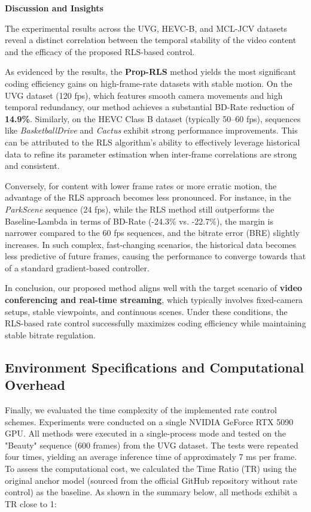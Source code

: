 \noindent \textbf{Discussion and Insights}

The experimental results across the UVG, HEVC-B, and MCL-JCV datasets reveal a distinct correlation between the temporal stability of the video content and the efficacy of the proposed RLS-based control.

As evidenced by the results, the \textbf{Prop-RLS} method yields the most significant coding efficiency gains on high-frame-rate datasets with stable motion. On the UVG dataset (120 fps), which features smooth camera movements and high temporal redundancy, our method achieves a substantial BD-Rate reduction of \textbf{14.9\%}. Similarly, on the HEVC Class B dataset (typically 50--60 fps), sequences like \textit{BasketballDrive} and \textit{Cactus} exhibit strong performance improvements. This can be attributed to the RLS algorithm's ability to effectively leverage historical data to refine its parameter estimation when inter-frame correlations are strong and consistent.

Conversely, for content with lower frame rates or more erratic motion, the advantage of the RLS approach becomes less pronounced. For instance, in the \textit{ParkScene} sequence (24 fps), while the RLS method still outperforms the Baseline-Lambda in terms of BD-Rate (-24.3\% vs. -22.7\%), the margin is narrower compared to the 60 fps sequences, and the bitrate error (BRE) slightly increases. In such complex, fast-changing scenarios, the historical data becomes less predictive of future frames, causing the performance to converge towards that of a standard gradient-based controller.

In conclusion, our proposed method aligns well with the target scenario of \textbf{video conferencing and real-time streaming}, which typically involves fixed-camera setups, stable viewpoints, and continuous scenes. Under these conditions, the RLS-based rate control successfully maximizes coding efficiency while maintaining stable bitrate regulation.




\subsection{Environment Specifications and Computational Overhead}

Finally, we evaluated the time complexity of the implemented rate control schemes. Experiments were conducted on a single NVIDIA GeForce RTX 5090 GPU. All methods were executed in a single-process mode and tested on the "Beauty" sequence (600 frames) from the UVG dataset. The tests were repeated four times, yielding an average inference time of approximately 7 ms per frame. To assess the computational cost, we calculated the Time Ratio (TR) using the original anchor model (sourced from the official GitHub repository without rate control) as the baseline. As shown in the summary below, all methods exhibit a TR close to 1:

